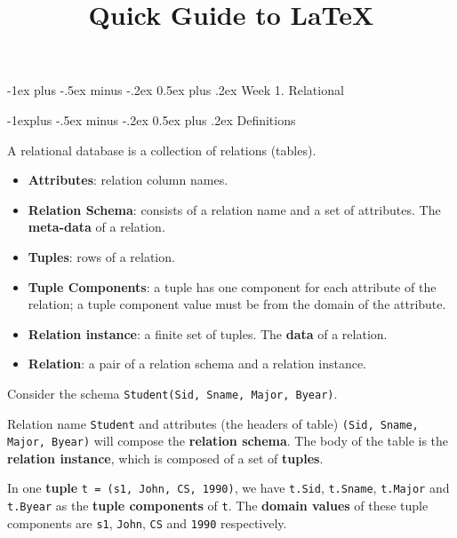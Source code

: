 \documentclass[10pt,landscape]{article}
\title{Quick Guide to LaTeX}
\makeatletter
\newcommand{\term}[1]{{\color{blue} \textbf{#1}}}
\newcommand{\exmp}[1]{{\texttt{#1}}}
\renewcommand{\section}{\@startsection{section}{1}{0mm}%
                                {-1ex plus -.5ex minus -.2ex}%
                                {0.5ex plus .2ex}%
                                {\normalfont\large\bfseries}}
\renewcommand{\subsection}{\@startsection{subsection}{2}{0mm}%
                                {-1explus -.5ex minus -.2ex}%
                                {0.5ex plus .2ex}%
                                {\normalfont\normalsize\bfseries}}
\makeatother
\begin{document}
\footnotesize

\begin{multicols}{4}
\setlength{\premulticols}{1pt}
\setlength{\postmulticols}{1pt}
\setlength{\multicolsep}{1pt}
\setlength{\columnsep}{2pt}



\section{Week 1. Relational}

\subsection{Definitions}

A relational database is a collection of relations (tables).

\begin{itemize}
	\item \term{Attributes}: relation column names.
	\item \term{Relation Schema}: consists of a relation name and a set of attributes. The \term{meta-data} of a relation.
	\item \term{Tuples}: rows of a relation.
	\item \term{Tuple Components}: a tuple has one component for each attribute of the relation; a tuple component value must be from the domain of the attribute.
	\item \term{Relation instance}: a finite set of tuples. The \term{data} of a relation.
	\item \term{Relation}: a pair of a relation schema and a relation instance.
\end{itemize}

Consider the schema \exmp{Student(Sid, Sname, Major, Byear)}.

Relation name \exmp{Student} and attributes (the headers of table) \exmp{(Sid, Sname, Major, Byear)} will compose the \term{relation schema}. The body of the table is the \term{relation instance}, which is composed of a set of \term{tuples}.

In one \term{tuple} \exmp{t = (s1, John, CS, 1990)}, we have \exmp{t.Sid}, \exmp{t.Sname}, \exmp{t.Major} and \exmp{t.Byear} as the \term{tuple components} of \exmp{t}. The \term{domain values} of these tuple components are \exmp{s1}, \exmp{John}, \exmp{CS} and \exmp{1990} respectively.


\end{multicols}
\end{document}
